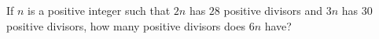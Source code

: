If $n$ is a positive integer such that $2n$ has $28$ positive divisors and $3n$ has $30$ positive divisors, how many positive divisors does $6n$ have?
